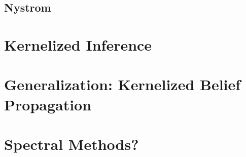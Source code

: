 \documentclass{article}
\begin{document}
\subsection{Nystrom}

\section{Kernelized Inference}

\section{Generalization: Kernelized Belief Propagation}

\section{Spectral Methods?}




\begin{appendix}
\begin{comment}
\section{Gradient Estimator Implementation}
In the log-semiring, addition is given by $\bigoplus = \LSE$ and multiplication
by $\bigotimes = +$.
Consider the linear chain CRF, $\bigotimes_t \psi(x_{t-1}, x_t)$,
with $\psi(x_{t-1}, t) = f(x_t) \oplus g(x_{t-1},x_t)$.
We would like to compute the gradient of the
log partition function, $A = \bigoplus_x \bigotimes_t \psi(x_{t-1}, x_t)$.
Recall the gradient identities 
\begin{equation}
\begin{aligned}
\nabla_a a \bigoplus b &= \frac{\exp(a)}{\exp(a \bigoplus b)}\\
\nabla_a a \bigotimes b &= 1.
\end{aligned}
\end{equation}

We then have 
\begin{equation}
\begin{aligned}
\nabla_{\psi(x_a,x_b)} &\bigoplus_t \psi(x_{t-1}, x_t)\\
&= \nabla_{\psi(x_a,x_b)} \bigoplus_t \psi(x_{t-1}, x_t)\\
\end{aligned}
\end{equation}
\end{comment}

\end{appendix}
\end{document}

